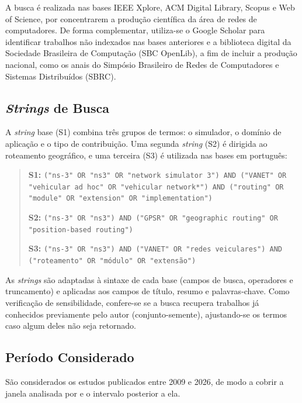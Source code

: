 A busca é realizada nas bases IEEE Xplore, ACM Digital Library, Scopus e Web of Science,
por concentrarem a produção científica da área de redes de computadores. De forma
complementar, utiliza-se o Google Scholar para identificar trabalhos não indexados nas
bases anteriores e a biblioteca digital da Sociedade Brasileira de Computação (SBC
OpenLib), a fim de incluir a produção nacional, como os anais do Simpósio Brasileiro de Redes
de Computadores e Sistemas Distribuídos (SBRC).

\subsection{\textit{Strings} de Busca}
\label{sec:strings}

A \textit{string} base (S1) combina três grupos de termos: o simulador, o domínio de aplicação
e o tipo de contribuição. Uma segunda \textit{string} (S2) é dirigida ao roteamento geográfico,
e uma terceira (S3) é utilizada nas bases em português:

\begin{quote}
\small
\textbf{S1:} \texttt{("ns-3" OR "ns3" OR "network simulator 3") AND ("VANET" OR "vehicular
ad hoc" OR "vehicular network*") AND ("routing" OR "module" OR "extension" OR
"implementation")}

\vspace{0.2cm}
\textbf{S2:} \texttt{("ns-3" OR "ns3") AND ("GPSR" OR "geographic routing" OR
"position-based routing")}

\vspace{0.2cm}
\textbf{S3:} \texttt{("ns-3" OR "ns3") AND ("VANET" OR "redes veiculares") AND
("roteamento" OR "módulo" OR "extensão")}
\end{quote}

As \textit{strings} são adaptadas à sintaxe de cada base (campos de busca, operadores e
truncamento) e aplicadas aos campos de título, resumo e palavras-chave. Como verificação de
sensibilidade, confere-se se a busca recupera trabalhos já conhecidos previamente pelo autor
(conjunto-semente), ajustando-se os termos caso algum deles não seja retornado.

\subsection{Período Considerado}
\label{sec:periodo}

São considerados os estudos publicados entre 2009 e 2026, de modo a cobrir a janela
analisada por  e o intervalo posterior a ela.

